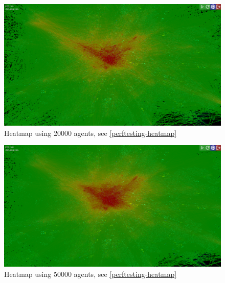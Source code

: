 \begin{figure}[h]
    \centering
    \includegraphics[width=140mm, keepaspectratio]{images/heatmap_20000.png}
    \caption{Heatmap using 20000 agents, see \ref{perftesting-heatmap}}
\end{figure}
\begin{figure}[h]
    \centering
    \includegraphics[width=140mm, keepaspectratio]{images/heatmap_50000.png}
    \caption{Heatmap using 50000 agents, see \ref{perftesting-heatmap}}
\end{figure}
